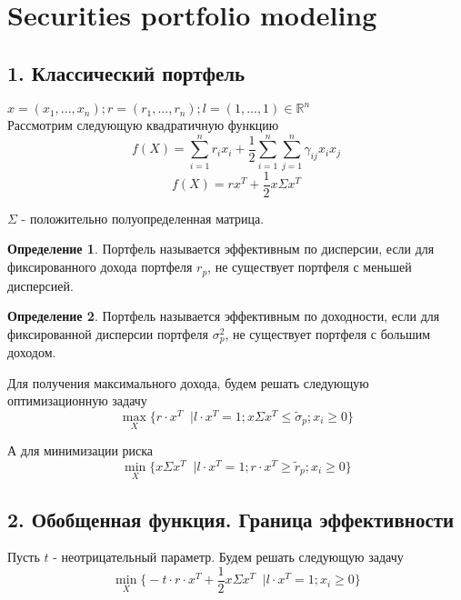 \documentclass[12pt]{article}
\theoremstyle{definition}
\newtheorem{definition}{Определение}
\theoremstyle{remark}
\begin{document}
\section*{Securities portfolio modeling}
\subsection*{1. Классический портфель}
$x = (x_1, ..., x_n); r=(r_1,...,r_n); l=(1,...,1)\in \mathbb{R}^n$\\
Рассмотрим следующую квадратичную функцию
\begin{equation}
  f(X)=\sum_{i=1}^nr_ix_i + \frac{1}{2}\sum_{i=1}^n\sum_{j=1}^n \gamma_{ij}x_ix_j
\end{equation}
\begin{equation}
  f(X)=r x^T+\frac{1}{2}x\Sigma x^T
\end{equation}

$\Sigma$ - положительно полуопределенная матрица.
\begin{definition}
  Портфель называется эффективным по дисперсии, если для фиксированного дохода портфеля $r_p$, не существует портфеля с меньшей дисперсией.
\end{definition}
\begin{definition}
  Портфель называется эффективным по доходности, если для фиксированной дисперсии портфеля $\sigma_p^2$, не существует портфеля с большим доходом.
\end{definition}
Для получения максимального дохода, будем решать следующую оптимизационную задачу
\begin{equation}
  \max\limits_{X}\big\{ r\cdot x^T \;\;\big| l \cdot x^T=1; x\Sigma x^T \leq \tilde{\sigma}_p; x_i \geq 0\big\}
\end{equation}

А для минимизации риска
\begin{equation}
  \min\limits_{X}\big\{ x\Sigma x^T \;\;\big| l \cdot x^T=1;r\cdot x^T  \geq \tilde{r}_p; x_i \geq 0\big\}
\end{equation}
\subsection*{2. Обобщенная функция. Граница эффективности}
Пусть $t$ - неотрицательный параметр. Будем решать следующую задачу
\begin{equation}
  \min\limits_{X}\big\{-t\cdot r\cdot x^T +\frac{1}{2} x\Sigma x^T \;\;\big| l \cdot x^T=1; x_i \geq 0\big\}
\end{equation}
\end{document}
